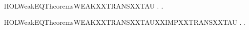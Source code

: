 \newcommand{\HOLWeakEQTheoremsWEAKXXTRANSXXSTABLE}{\UseVerbatim{HOLWeakEQTheoremsWEAKXXTRANSXXSTABLE}}
\begin{SaveVerbatim}{HOLWeakEQTheoremsWEAKXXTRANSXXTAU}
\HOLTokenTurnstile{} \HOLSymConst{\HOLTokenForall{}} .  \HOLTokenWeakTransBegin\HOLConst{\ensuremath{\tau}}\HOLTokenWeakTransEnd {} \HOLSymConst{\HOLTokenEquiv{}} \HOLSymConst{\HOLTokenExists{}}.  \HOLTokenTransBegin\HOLConst{\ensuremath{\tau}}\HOLTokenTransEnd {} \HOLSymConst{\HOLTokenConj{}}   
\end{SaveVerbatim}
\newcommand{\HOLWeakEQTheoremsWEAKXXTRANSXXTAU}{\UseVerbatim{HOLWeakEQTheoremsWEAKXXTRANSXXTAU}}
\begin{SaveVerbatim}{HOLWeakEQTheoremsWEAKXXTRANSXXTAUXXIMPXXTRANSXXTAU}
\HOLTokenTurnstile{} \HOLSymConst{\HOLTokenForall{}} .  \HOLTokenWeakTransBegin\HOLConst{\ensuremath{\tau}}\HOLTokenWeakTransEnd {} \HOLSymConst{\HOLTokenImp{}} \HOLSymConst{\HOLTokenExists{}}.  \HOLTokenTransBegin\HOLConst{\ensuremath{\tau}}\HOLTokenTransEnd {} \HOLSymConst{\HOLTokenConj{}}   
\end{SaveVerbatim}
\newcommand{\HOLWeakEQTheoremsWEAKXXTRANSXXTAUXXIMPXXTRANSXXTAU}{\UseVerbatim{HOLWeakEQTheoremsWEAKXXTRANSXXTAUXXIMPXXTRANSXXTAU}}
